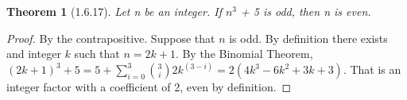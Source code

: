 \documentclass[a4paper, 12pt]{article}
\theoremstyle{plain}
\newtheorem*{theorem*}{Theorem}
\begin{document}
	
	\begin{theorem*}[1.6.17]
		Let n be an integer. If $n^{3}$ + 5 is odd, then n is even.
	\end{theorem*}
	
	\begin{proof}
		By the contrapositive. Suppose that $n$ is odd. By definition there exists and integer $k$ such 
		that $n = 2k + 1$. By the Binomial Theorem, 
		$(2k + 1)^{3} + 5 = 5 + \sum\limits_{i=0}^3 {3 \choose i} 2k^{(3-i)} = 2(4k^{3} - 6k^{2} + 3k + 3)$. 
		That is an integer factor with a coefficient of 2, even by definition.
	\end{proof}
\end{document}
